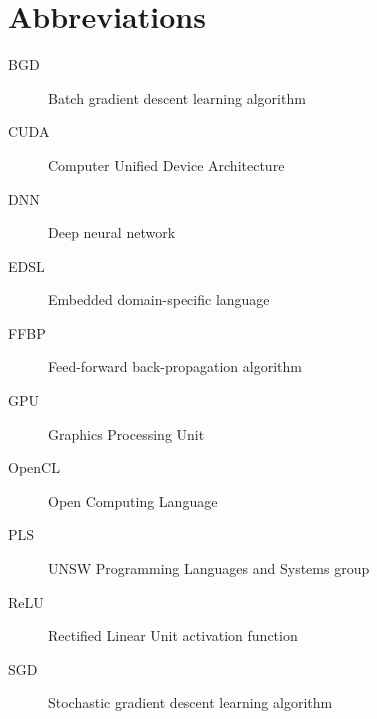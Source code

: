 \chapter*{Abbreviations}\label{abbr}
\begin{description}
\item[BGD] Batch gradient descent learning algorithm
\item[CUDA] Computer Unified Device Architecture
\item[DNN] Deep neural network
\item[EDSL] Embedded domain-specific language
\item[FFBP] Feed-forward back-propagation algorithm
\item[GPU] Graphics Processing Unit
\item[OpenCL] Open Computing Language
\item[PLS] UNSW Programming Languages and Systems group
\item[ReLU] Rectified Linear Unit activation function
\item[SGD] Stochastic gradient descent learning algorithm
\end{description}